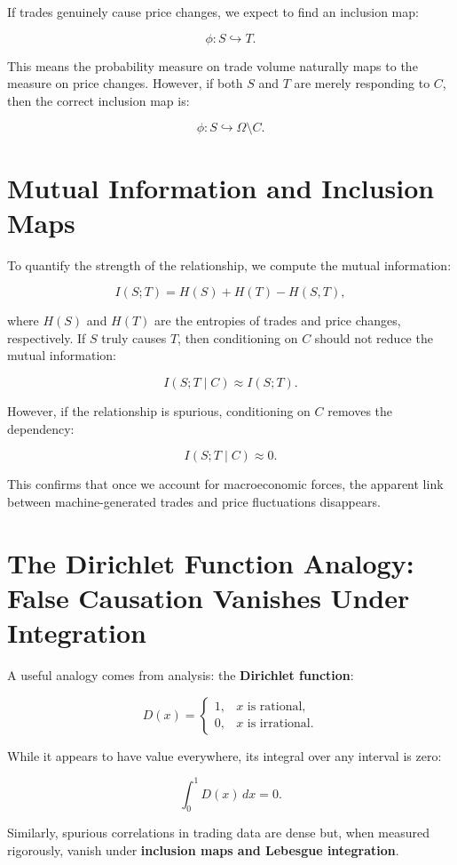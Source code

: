 If trades genuinely cause price changes, we expect to find an inclusion map:

\[
\phi: S \hookrightarrow T.
\]

This means the probability measure on trade volume naturally maps to the measure on price changes. However, if both \( S \) and \( T \) are merely responding to \( C \), then the correct inclusion map is:

\[
\phi: S \hookrightarrow \Omega \setminus C.
\]

\section{Mutual Information and Inclusion Maps}

To quantify the strength of the relationship, we compute the mutual information:

\[
I(S; T) = H(S) + H(T) - H(S, T),
\]

where \( H(S) \) and \( H(T) \) are the entropies of trades and price changes, respectively. If \( S \) truly causes \( T \), then conditioning on \( C \) should not reduce the mutual information:

\[
I(S; T \mid C) \approx I(S; T).
\]

However, if the relationship is spurious, conditioning on \( C \) removes the dependency:

\[
I(S; T \mid C) \approx 0.
\]

This confirms that once we account for macroeconomic forces, the apparent link between machine-generated trades and price fluctuations disappears.

\section{The Dirichlet Function Analogy: False Causation Vanishes Under Integration}

A useful analogy comes from analysis: the \textbf{Dirichlet function}:

\[
D(x) =
\begin{cases}
1, & x \text{ is rational}, \\
0, & x \text{ is irrational}.
\end{cases}
\]

While it appears to have value everywhere, its integral over any interval is zero:

\[
\int_{0}^{1} D(x) \,dx = 0.
\]

Similarly, spurious correlations in trading data are dense but, when measured rigorously, vanish under \textbf{inclusion maps and Lebesgue integration}.

